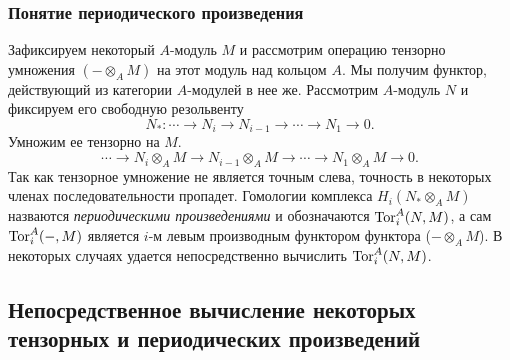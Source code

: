     \subsubsection{Понятие периодического произведения}
    Зафиксируем некоторый $A$-модуль $M$ и рассмотрим операцию тензорно умножения $(-\otimes_A M)$ на этот модуль над кольцом $A$. 
    Мы получим функтор, действующий из категории $A$-модулей в нее же. Рассмотрим $A$-модуль $N$ и фиксируем его свободную резольвенту 
    \begin{equation*}
        N_* : \cdots \rightarrow N_i \rightarrow N_{i-1} \rightarrow \cdots \rightarrow N_1 \rightarrow 0.
    \end{equation*}
    Умножим ее тензорно на $M$.
    \begin{equation*}
        \cdots \rightarrow N_i \otimes_A M \rightarrow N_{i-1} \otimes_A M \rightarrow \cdots \rightarrow N_1 \otimes_A M \rightarrow 0.
    \end{equation*}
    Так как тензорное умножение не является точным слева, точность в некоторых членах последовательности пропадет. 
    Гомологии комплекса $H_i(N_* \otimes_A M)$ назваются \textit{периодическими 
    произведениями} и обозначаются $\textup{Tor}_i^A(N, M)$, а сам $\textup{Tor}_i^A(-, M)$ является $i$-м левым производным функтором функтора ($- \otimes_A M$). 
    В некоторых случаях удается непосредственно вычислить $\textup{Tor}_i^A(N, M)$. 

    \subsection{Непосредственное вычисление некоторых тензорных и периодических произведений}

